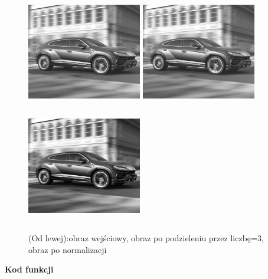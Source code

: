 \documentclass[magisterska,openany]{pracadypl}
\begin{document}
\begin{figure}[h]
\centering
\includegraphics[width=5cm, height=5cm]{orgi/gLU.jpg}
\includegraphics[width=5cm, height=5cm]{3_7/div_constG2.jpg}
\includegraphics[width=5cm, height=5cm]{3_7/ndiv_constG2.jpg}
\caption{(Od lewej):obraz wejściowy, obraz po podzieleniu przez liczbę=3,
obraz po normalizacji}
\end{figure}

\newpage
\textbf{\Large Kod funkcji}
   
\end{document}

